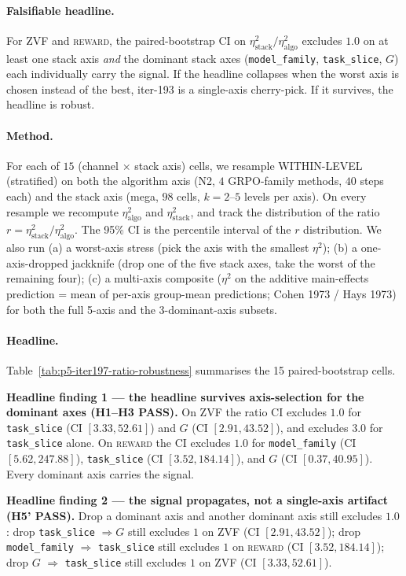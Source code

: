 \documentclass{article}  \usepackage[preprint,nonatbib]{neurips_2026} \usepackage[numbers]{natbib}
\providecommand{\tableref}[1]{Table~\ref{#1}}
\begin{document}
\paragraph{Falsifiable headline.}
For \textsc{ZVF} and \textsc{reward}, the paired-bootstrap CI on
$\eta^2_\text{stack}/\eta^2_\text{algo}$ excludes $1.0$ on at least one
stack axis \emph{and} the dominant stack axes
(\texttt{model\_family}, \texttt{task\_slice}, $G$) each individually
carry the signal. If the headline collapses when the worst axis is
chosen instead of the best, iter-193 is a single-axis cherry-pick. If it
survives, the headline is robust.

\paragraph{Method.}
For each of $15$ (channel $\times$ stack axis) cells,
we resample WITHIN-LEVEL (stratified) on both the algorithm axis
(N2, $4$ GRPO-family methods, $40$ steps each) and the stack axis
(mega, $98$ cells, $k=2$--$5$ levels per axis). On every resample we
recompute $\eta^2_\text{algo}$ and $\eta^2_\text{stack}$, and track the
distribution of the ratio $r = \eta^2_\text{stack} / \eta^2_\text{algo}$.
The 95\% CI is the percentile interval of the $r$ distribution. We also
run (a) a worst-axis stress (pick the axis with the smallest
$\eta^2$); (b) a one-axis-dropped jackknife (drop one of the five
stack axes, take the worst of the remaining four); (c) a multi-axis
composite ($\eta^2$ on the additive main-effects prediction = mean of
per-axis group-mean predictions; Cohen 1973 / Hays 1973) for both the
full 5-axis and the 3-dominant-axis subsets.

\paragraph{Headline.}
\tableref{tab:p5-iter197-ratio-robustness} summarises the 15 paired-bootstrap
cells.

\textbf{Headline finding 1 --- the headline survives axis-selection for
the dominant axes (H1--H3 PASS).} On \textsc{ZVF} the ratio CI excludes
$1.0$ for \texttt{task\_slice} (CI $[3.33, 52.61]$) and $G$ (CI $[2.91,
43.52]$), and excludes $3.0$ for \texttt{task\_slice} alone. On
\textsc{reward} the CI excludes $1.0$ for \texttt{model\_family} (CI
$[5.62, 247.88]$), \texttt{task\_slice} (CI $[3.52, 184.14]$), and $G$ (CI
$[0.37, 40.95]$). Every dominant axis carries the signal.

\textbf{Headline finding 2 --- the signal propagates, not a single-axis
artifact (H5' PASS).} Drop a dominant axis and another dominant axis
still excludes $1.0$: drop \texttt{task\_slice} $\Rightarrow G$ still
excludes $1$ on \textsc{ZVF} (CI $[2.91, 43.52]$); drop
\texttt{model\_family} $\Rightarrow$ \texttt{task\_slice} still excludes
$1$ on \textsc{reward} (CI $[3.52, 184.14]$); drop $G$ $\Rightarrow$
\texttt{task\_slice} still excludes $1$ on \textsc{ZVF} (CI $[3.33,
52.61]$).
\end{document}
